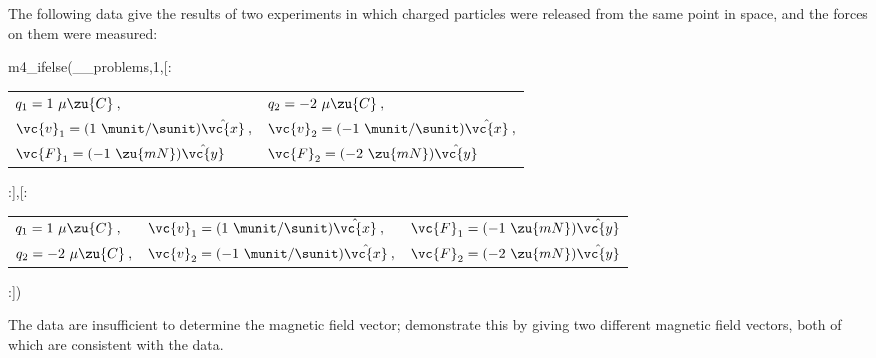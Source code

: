 The following data give the results of two experiments in which charged particles
        were released from the same point in space, and the forces on them were measured:
        
m4_ifelse(__problems,1,[:
        \begin{tabular}{ll}
                $q_1=1\ \mu\zu{C}\:,$ &
                       $q_2=-2\ \mu\zu{C}\:,$ \\
                $\vc{v}_1=(1\ \munit/\sunit)\hat{\vc{x}}\:,$ &
                       $\vc{v}_2=(-1\ \munit/\sunit)\hat{\vc{x}}\:,$ \\
                $\vc{F}_1=(-1\ \zu{mN})\hat{\vc{y}}$ &
                       $\vc{F}_2=(-2\ \zu{mN})\hat{\vc{y}}$\\
        \end{tabular}
:],[:
        \begin{tabular}{lll}
                $q_1=1\ \mu\zu{C}\:,$ & $\vc{v}_1=(1\ \munit/\sunit)\hat{\vc{x}}\:,$ & $\vc{F}_1=(-1\ \zu{mN})\hat{\vc{y}}$\\
                $q_2=-2\ \mu\zu{C}\:,$ & $\vc{v}_2=(-1\ \munit/\sunit)\hat{\vc{x}}\:,$ & $\vc{F}_2=(-2\ \zu{mN})\hat{\vc{y}}$\\
        \end{tabular}
:])

        \noindent The data are insufficient to determine the magnetic field vector; demonstrate this
        by giving two different magnetic field vectors, both of which are consistent with the data.
